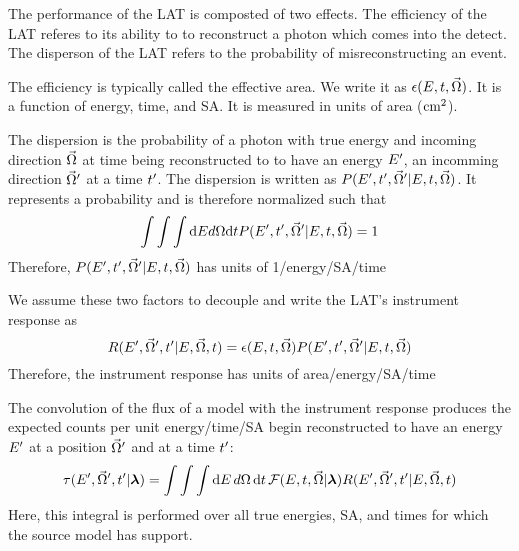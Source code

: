 

The performance of the LAT is composted of two effects.
The efficiency of the LAT referes to its ability to to
reconstruct a photon which comes into the detect.
The disperson of the LAT refers to the probability of
misreconstructing an event. 


The efficiency is typically called the effective area.
We write it as $\epsilon(E,t,\vec\Omega)$.
It is a function of energy, time, and \ac{SA}.
It is measured in units of area ($\text{cm}^2$).



The dispersion is the probability of a photon with true energy \energy
and incoming direction $\vec\Omega$ at time \time being reconstructed to 
to have an energy $E'$, an incomming direction $\vec\Omega'$ at a time $t'$.
The dispersion is written as $P(E',t',\vec\Omega'|E,t,\vec\Omega)$.
It represents a probability and is therefore normalized such that
\begin{equation}
  \int \int \int \text{d}E d\Omega \text{d}t P(E',t',\vec\Omega'|E,t,\vec\Omega) = 1
\end{equation}
Therefore, $P(E',t',\vec\Omega'|E,t,\vec\Omega)$ 
has units of 1/energy/\acl{SA}/time



We assume these two factors to decouple and write the LAT's instrument response as
\begin{equation}
  R(E',\vec\Omega',t'|E,\vec\Omega,t) = 
\epsilon(E,t,\vec\Omega) P(E',t',\vec\Omega'|E,t,\vec\Omega)
\end{equation}
Therefore, the instrument response has units of area/energy/\acl{SA}/time

The convolution of the flux of a model with the instrument response 
produces the expected counts per unit energy/time/\acl{SA}
begin reconstructed to have 
an energy $E'$ 
at a position $\vec\Omega'$ and at a time $t'$:
\begin{equation}
  \eqnlabel{eventrate}
  \eventrate(\energy',\solidangle',\time'|\modelparams)
  = \int \int \int \denergy \, \dsolidangle \, \dtime \,
  \fluxdensity(\energy,\time,\vec\Omega|\modelparams) \response(\energy',\solidangle',\time'|\energy,\solidangle,\time)
\end{equation}
Here, this integral is performed over all true energies, \acs{SA}, and times
for which the source model has support.

